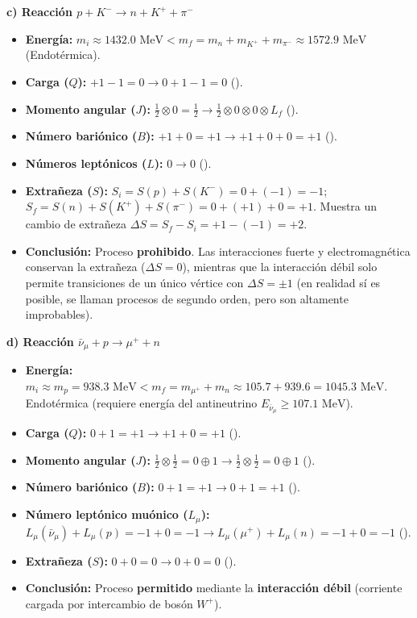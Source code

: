 \begin{problema}
\textbf{c) Reacción $p + K^- \to n + K^+ + \pi^-$}
\begin{itemize}
    \item \textbf{Energía:} $m_i \approx 1432.0 \text{ MeV} < m_f = m_n + m_{K^+} + m_{\pi^-} \approx 1572.9 \text{ MeV}$ (Endotérmica).
    \item \textbf{Carga ($Q$):} $+1 - 1 = 0 \to 0 + 1 - 1 = 0$ (\checkmark).
    \item \textbf{Momento angular ($J$):} $\frac{1}{2} \otimes 0 = \frac{1}{2} \to \frac{1}{2} \otimes 0 \otimes 0 \otimes L_f$ (\checkmark).
    \item \textbf{Número bariónico ($B$):} $+1 + 0 = +1 \to +1 + 0 + 0 = +1$ (\checkmark).
    \item \textbf{Números leptónicos ($L$):} $0 \to 0$ (\checkmark).
    \item \textbf{Extrañeza ($S$):} $S_i = S(p) + S(K^-) = 0 + (-1) = -1$; $S_f = S(n) + S(K^+) + S(\pi^-) = 0 + (+1) + 0 = +1$. Muestra un cambio de extrañeza $\Delta S = S_f - S_i = +1 - (-1) = +2$.
    \item \textbf{Conclusión:} Proceso \textbf{prohibido}. Las interacciones fuerte y electromagnética conservan la extrañeza ($\Delta S = 0$), mientras que la interacción débil solo permite transiciones de un único vértice con $\Delta S = \pm 1$ (en realidad sí es posible, se llaman procesos de segundo orden, pero son altamente improbables).
\end{itemize}

\textbf{d) Reacción $\bar{\nu}_\mu + p \to \mu^+ + n$}
\begin{itemize}
    \item \textbf{Energía:} $m_i \approx m_p = 938.3 \text{ MeV} < m_f = m_{\mu^+} + m_n \approx 105.7 + 939.6 = 1045.3 \text{ MeV}$. Endotérmica (requiere energía del antineutrino $E_{\bar{\nu}_\mu} \ge 107.1 \text{ MeV}$).
    \item \textbf{Carga ($Q$):} $0 + 1 = +1 \to +1 + 0 = +1$ (\checkmark).
    \item \textbf{Momento angular ($J$):} $\frac{1}{2} \otimes \frac{1}{2} = 0 \oplus 1 \to \frac{1}{2} \otimes \frac{1}{2} = 0 \oplus 1$ (\checkmark).
    \item \textbf{Número bariónico ($B$):} $0 + 1 = +1 \to 0 + 1 = +1$ (\checkmark).
    \item \textbf{Número leptónico muónico ($L_\mu$):} $L_\mu(\bar{\nu}_\mu) + L_\mu(p) = -1 + 0 = -1 \to L_\mu(\mu^+) + L_\mu(n) = -1 + 0 = -1$ (\checkmark).
    \item \textbf{Extrañeza ($S$):} $0 + 0 = 0 \to 0 + 0 = 0$ (\checkmark).
    \item \textbf{Conclusión:} Proceso \textbf{permitido} mediante la \textbf{interacción débil} (corriente cargada por intercambio de bosón $W^+$).
\end{itemize}


\end{problema}
